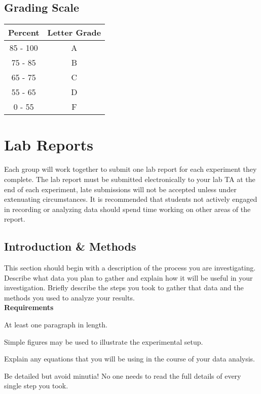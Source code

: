 \subsection*{Grading Scale}
\begin{table}[ht]
\centering
\begin{tabular}{|c|c|}
\hline 
\rule[-1ex]{0pt}{2.5ex} Percent & Letter Grade \\ 
\hline 
\rule[-1ex]{0pt}{2.5ex} 85 - 100 & A \\ 
\hline 
\rule[-1ex]{0pt}{2.5ex} 75 - 85 & B \\ 
\hline 
\rule[-1ex]{0pt}{2.5ex} 65 - 75 & C \\ 
\hline 
\rule[-1ex]{0pt}{2.5ex} 55 - 65 & D \\ 
\hline 
\rule[-1ex]{0pt}{2.5ex} 0 - 55 & F \\ 
\hline 
\end{tabular}
\end{table}

\newpage

\section*{Lab Reports}
Each group will work together to submit one lab report for each experiment they complete.
The lab report must be submitted electronically to your lab TA at the end of each experiment, late submissions will not be accepted unless under extenuating circumstances.
It is recommended that students not actively engaged in recording or analyzing data should spend time working on other areas of the report.

\subsection*{Introduction \& Methods}
This section should begin with a description of the process you are investigating.
Describe what data you plan to gather and explain how it will be useful in your investigation.
Briefly describe the steps you took to gather that data and the methods you used to analyze your results. \\
\textbf{Requirements}
\begin{list}{-}{\topsep=0pt \itemsep=-2pt}
	\item At least one paragraph in length.
	\item Simple figures may be used to illustrate the experimental setup.
	\item Explain any equations that you will be using in the course of your data analysis.
	\item Be detailed but avoid minutia! No one needs to read the full details of every single step you took. 
\end{list}

